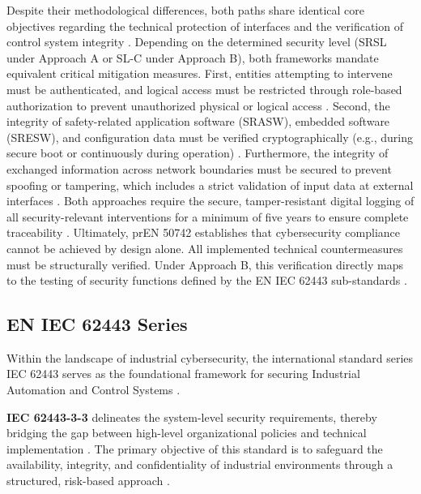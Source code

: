 Despite their methodological differences, both paths share identical core objectives regarding the technical protection of interfaces and the verification of control system integrity \cite[p. 15]{prEN50742_2025}. Depending on the determined security level (SRSL under Approach A or SL-C under Approach B), both frameworks mandate equivalent critical mitigation measures. First, entities attempting to intervene must be authenticated, and logical access must be restricted through role-based authorization to prevent unauthorized physical or logical access \cite[pp. 17, pp. 24]{prEN50742_2025}. Second, the integrity of safety-related application software (SRASW), embedded software (SRESW), and configuration data must be verified cryptographically (e.g., during secure boot or continuously during operation) \cite[p. 17 f]{prEN50742_2025}. Furthermore, the integrity of exchanged information across network boundaries must be secured to prevent spoofing or tampering, which includes a strict validation of input data at external interfaces \cite[p. 50]{prEN50742_2025}. Both approaches require the secure, tamper-resistant digital logging of all security-relevant interventions for a minimum of five years to ensure complete traceability \cite[p. 19, S. 23]{prEN50742_2025}. Ultimately, prEN 50742 establishes that cybersecurity compliance cannot be achieved by design alone. All implemented technical countermeasures must be structurally verified. Under Approach B, this verification directly maps to the testing of security functions defined by the EN IEC 62443 sub-standards \cite[p. 14]{prEN50742_2025}. 

\subsection{EN IEC 62443 Series} 
\label{subsec:iec_62443} 

Within the landscape of industrial cybersecurity, the international standard series 
IEC 62443 serves as the foundational framework for securing Industrial Automation 
and Control Systems \cite[p. 13]{IEC62443-3-3}. 


\textbf{IEC 62443-3-3} delineates the system-level security requirements, thereby bridging the gap between high-level organizational policies and technical implementation  \cite[p. 15]{IEC62443-3-3}. The primary objective of this standard is to safeguard the availability, integrity, and confidentiality of industrial environments through a structured, risk-based approach \cite[p. 6]{IEC62443-3-3}. 


